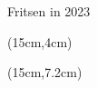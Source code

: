 \thispagestyle{empty}



\begingroup
    \fontsize{80pt}{82pt}\selectfont
    \begin{center}Fritsen in 2023\end{center}
\endgroup

\vspace{0.5cm}


\begin{textblock*}{5cm}(15cm,4cm) %
\end{textblock*}

\begin{textblock*}{5cm}(15cm,7.2cm) %
    \tweedeDruk
 \end{textblock*}
 








